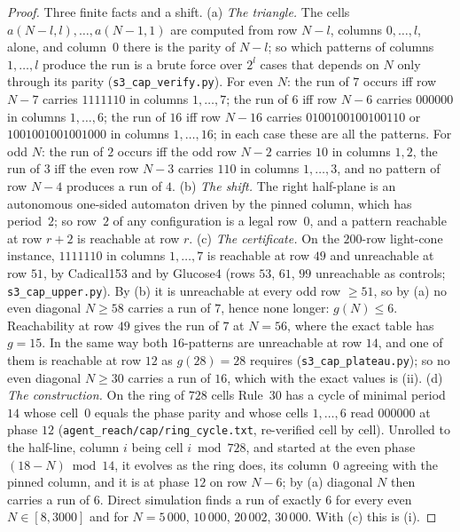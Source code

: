 \documentclass[11pt]{article}
\theoremstyle{definition}
\theoremstyle{remark}
\begin{document}
\begin{proof}
Three finite facts and a shift. (a) \emph{The triangle.} The cells $a(N-l,l),\dots,a(N-1,1)$ are
computed from row $N-l$, columns $0,\dots,l$, alone, and column~$0$ there is the parity of $N-l$; so
which patterns of columns $1,\dots,l$ produce the run is a brute force over $2^{l}$ cases that depends on
$N$ only through its parity (\texttt{s3\_cap\_verify.py}). For even $N$: the run of $7$ occurs iff row
$N-7$ carries $1111110$ in columns $1,\dots,7$; the run of $6$ iff row $N-6$ carries $000000$ in
columns $1,\dots,6$; the run of $16$ iff row $N-16$ carries $0100100100100110$ or $1001001001001000$ in
columns $1,\dots,16$; in each case these are all the patterns. For odd $N$: the run of $2$ occurs iff
the odd row $N-2$ carries $10$ in columns $1,2$, the run of $3$ iff the even row $N-3$ carries $110$ in
columns $1,\dots,3$, and no pattern of row $N-4$ produces a run of $4$. (b) \emph{The shift.} The right half-plane is an autonomous
one-sided automaton driven by the pinned column, which has period~$2$; so row~$2$ of any configuration
is a legal row~$0$, and a pattern reachable at row $r+2$ is reachable at row $r$. (c) \emph{The
certificate.} On the $200$-row light-cone instance, $1111110$ in columns $1,\dots,7$ is reachable at
row $49$ and unreachable at row $51$, by Cadical153 and by Glucose4 (rows $53$, $61$, $99$ unreachable
as controls; \texttt{s3\_cap\_upper.py}). By (b) it is unreachable at every odd row $\ge51$, so by (a)
no even diagonal $N\ge58$ carries a run of $7$, hence none longer: $g(N)\le6$. Reachability at row $49$
gives the run of $7$ at $N=56$, where the exact table has $g=15$. In the same way both $16$-patterns are
unreachable at row $14$, and one of them is reachable at row $12$ as $g(28)=28$ requires
(\texttt{s3\_cap\_plateau.py}); so no even diagonal $N\ge30$ carries a run of $16$, which with the
exact values is (ii). (d) \emph{The construction.} On the ring of $728$ cells Rule~30 has a cycle of
minimal period $14$ whose cell~$0$ equals the phase parity and whose cells $1,\dots,6$ read $000000$ at
phase $12$ (\texttt{agent\_reach/cap/ring\_cycle.txt}, re-verified cell by cell). Unrolled to the
half-line, column $i$ being cell $i\bmod728$, and started at the even phase $(18-N)\bmod14$, it evolves
as the ring does, its column~$0$ agreeing with the pinned column, and it is at phase $12$ on row $N-6$;
by (a) diagonal $N$ then carries a run of $6$. Direct simulation finds a run of exactly $6$ for every
even $N\in[8,3000]$ and for $N=5\,000$, $10\,000$, $20\,002$, $30\,000$. With (c) this is (i).

\end{proof}
\end{document}
